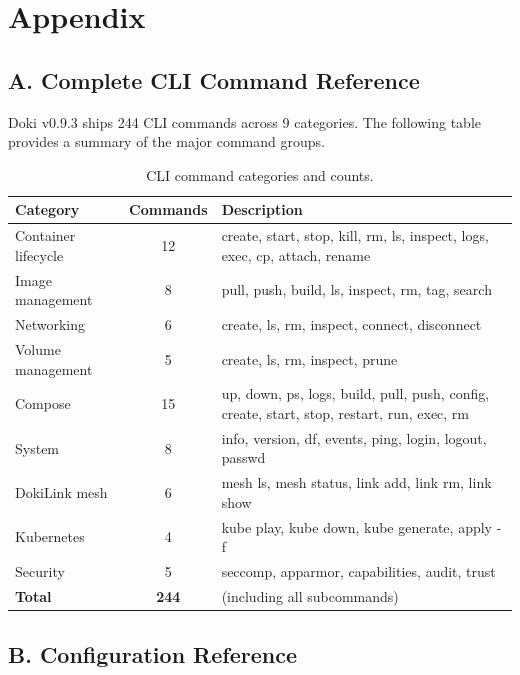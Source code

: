 \chapter{Appendix}
\label{ch:appendix}

\section{A. Complete CLI Command Reference}
\label{sec:cli-reference}

Doki v0.9.3 ships 244 CLI commands across 9 categories. The following
table provides a summary of the major command groups.

\begin{table}[htbp]
  \centering
  \caption{CLI command categories and counts.}
  \label{tab:cli-categories}
  \begin{tabularx}{\textwidth}{l c X}
    \toprule
    \textbf{Category} & \textbf{Commands} & \textbf{Description} \\
    \midrule
    Container lifecycle & 12 & create, start, stop, kill, rm, ls, inspect, logs, exec, cp, attach, rename \\
    Image management    & 8  & pull, push, build, ls, inspect, rm, tag, search \\
    Networking          & 6  & create, ls, rm, inspect, connect, disconnect \\
    Volume management   & 5  & create, ls, rm, inspect, prune \\
    Compose             & 15 & up, down, ps, logs, build, pull, push, config, create, start, stop, restart, run, exec, rm \\
    System              & 8  & info, version, df, events, ping, login, logout, passwd \\
    DokiLink mesh       & 6  & mesh ls, mesh status, link add, link rm, link show \\
    Kubernetes          & 4  & kube play, kube down, kube generate, apply -f \\
    Security            & 5  & seccomp, apparmor, capabilities, audit, trust \\
    \midrule
    \textbf{Total}      & \textbf{244} & (including all subcommands) \\
    \bottomrule
  \end{tabularx}
\end{table}

\section{B. Configuration Reference}
\label{sec:config-reference}


